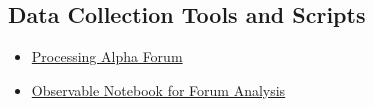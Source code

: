 \appendix


\subsection{Data Collection Tools and Scripts}

\begin{itemize}
    \item \href{https://forum.processing.org/alpha/}{Processing Alpha Forum}
    \item \href{https://observablehq.com/d/042b1cf42ea9bb5e}{Observable Notebook for Forum Analysis}
\end{itemize}
